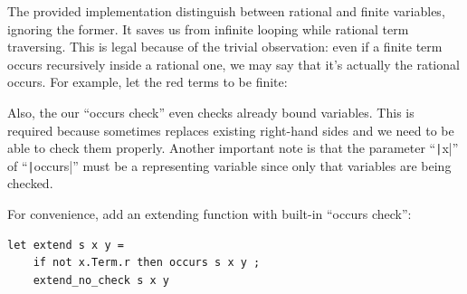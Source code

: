 The provided implementation distinguish between rational and finite variables, ignoring the former. It saves us from infinite looping while rational term traversing. This is legal because of the trivial observation: even if a finite term occurs recursively inside a rational one, we may say that it's actually the rational occurs. For example, let the red terms to be finite:
\begin{figure}[H]
    \centering
\end{figure}

Also, the our ``occurs check'' even checks already bound variables. This is required because \union sometimes replaces existing right-hand sides and we need to be able to check them properly. Another important note is that the parameter ``\texttt|x|'' of ``\texttt|occurs|'' must be a representing variable since only that variables are being checked.

For convenience, add an extending function with built-in ``occurs check'':
\begin{verbatim}
let extend s x y =
    if not x.Term.r then occurs s x y ;
    extend_no_check s x y
\end{verbatim}

